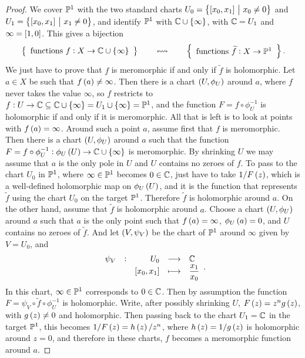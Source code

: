 \begin{proof}
We cover $ \mathbb{P}^1 $ with the two standard charts $ U_0 = \cbr{\sbr{x_0, x_1} \st x_0 \ne 0} $ and $ U_1 = \cbr{\sbr{x_0, x_1} \st x_1 \ne 0} $, and identify $ \mathbb{P}^1 $ with $ \CC \cup \cbr{\infty} $, with $ \mathbb{C} = U_1 $ and $ \infty = \sbr{1, 0} $. This gives a bijection
$$ \correspondence{\text{functions} \ f : X \to \CC \cup \cbr{\infty}}{\text{functions} \ \widetilde{f} : X \to \PP^1}. $$
We just have to prove that $ f $ is meromorphic if and only if $ \widetilde{f} $ is holomorphic. Let $ a \in X $ be such that $ f\br{a} \ne \infty $. Then there is a chart $ \br{U, \phi_U} $ around $ a $, where $ f $ never takes the value $ \infty $, so $ f $ restricts to $ f : U \to \CC \subseteq \CC \cup \cbr{\infty} = U_1 \cup \cbr{\infty} = \PP^1 $, and the function $ F = f \circ \phi_U^{-1} $ is holomorphic if and only if it is meromorphic. All that is left is to look at points with $ f\br{a} = \infty $. Around such a point $ a $, assume first that $ f $ is meromorphic. Then there is a chart $ \br{U, \phi_U} $ around $ a $ such that the function $ F = f \circ \phi_U^{-1} : \phi_U\br{U} \to \CC \cup \cbr{\infty} $ is meromorphic. By shrinking $ U $ we may assume that $ a $ is the only pole in $ U $ and $ U $ contains no zeroes of $ f $. To pass to the chart $ U_0 $ in $ \mathbb{P}^1 $, where $ \infty \in \mathbb{P}^1 $ becomes $ 0 \in \mathbb{C} $, just have to take $ 1 / F\br{z} $, which is a well-defined holomorphic map on $ \phi_U\br{U} $, and it is the function that represents $ \widetilde{f} $ using the chart $ U_0 $ on the target $ \mathbb{P}^1 $. Therefore $ \widetilde{f} $ is holomorphic around $ a $. On the other hand, assume that $ \widetilde{f} $ is holomorphic around $ a $. Choose a chart $ \br{U, \phi_U} $ around $ a $ such that $ a $ is the only point such that $ f\br{a} = \infty $, $ \phi_U\br{a} = 0 $, and $ U $ contains no zeroes of $ \widetilde{f} $. And let $ \br{V, \psi_V} $ be the chart of $ \mathbb{P}^1 $ around $ \infty $ given by $ V = U_0 $, and
$$ \function[\psi_V]{U_0}{\CC}{\sbr{x_0, x_1}}{\dfrac{x_1}{x_0}}. $$
In this chart, $ \infty \in \mathbb{P}^1 $ corresponds to $ 0 \in \mathbb{C} $. Then by assumption the function $ F = \psi_V \circ \widetilde{f} \circ \phi_U^{-1} $ is holomorphic. Write, after possibly shrinking $ U $, $ F\br{z} = z^ng\br{z} $, with $ g\br{z} \ne 0 $ and holomorphic. Then passing back to the chart $ U_1 = \mathbb{C} $ in the target $ \mathbb{P}^1 $, this becomes $ 1 / F\br{z} = h\br{z} / z^n $, where $ h\br{z} = 1 / g\br{z} $ is holomorphic around $ z = 0 $, and therefore in these charts, $ f $ becomes a meromorphic function around $ a $.
\end{proof}

